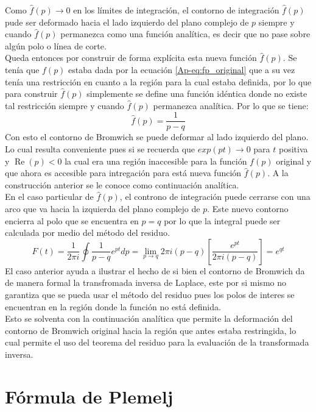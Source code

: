 \documentclass[../tesis_main_file.tex]{subfiles}
\begin{document}
Como $\widehat{f}(p) \rightarrow 0$ en los límites de integración, el contorno de integración $\widehat{f}(p)$ pude ser deformado hacia el lado izquierdo del plano complejo de $p$ siempre y cuando $\widehat{f}(p)$ permanezca como una función analítica, es decir que no pase sobre algún polo o línea de corte.\\
Queda entonces por construir de forma explícita esta nueva función $\widehat{f}(p)$. Se tenía que $f(p)$ estaba dada por la ecuación \ref{Ap-eq:fp_original} que a su vez tenía una restricción en cuanto a la región para la cual estaba definida, por lo que para construir $\widehat{f}(p)$ simplemente se define una función idéntica donde no existe tal restricción siempre y cuando $\widehat{f}(p)$ permanezca analítica. Por lo que se tiene:
\begin{equation}
\widehat{f}(p) = \frac{1}{p-q}
\end{equation}
Con esto el contorno de Bromwich se puede deformar al lado izquierdo del plano. Lo cual resulta conveniente pues si se recuerda que $exp(pt) \rightarrow 0$ para $t$ positiva y $\operatorname{Re}(p) <0$ la cual era una región inaccesible para la función $f(p)$ original y que ahora es accesible para intregación para está nueva función $\widehat{f}(p)$. A la construcción anterior se le conoce como continuación analítica.\\
En el caso particular de $\widehat{f}(p)$, el controno de integración puede cerrarse con una arco que va hacia la izquierda del plano complejo de $p$. Este nuevo contorno encierra al polo que se encuentra en $p=q$ por lo que la integral puede ser calculada por medio del método del residuo.
\begin{equation}
F(t) =\frac{1}{2\pi i}\oint \frac{1}{p-q}e^{pt}dp= \lim_{p\to q}2\pi i(p-q)\left[\frac{e^{pt}}{2\pi i (p-q)}\right]=e^{qt}
\end{equation}
El caso anterior ayuda a ilustrar el hecho de si bien el contorno de Bromwich da de manera formal la transfromada inversa de Laplace, este por si mismo no garantiza que se pueda usar el método del residuo pues los polos de interes se encuentran en la región donde la función no está definida.\\
Esto se solventa con la continuación analítica que permite la deformación del contorno de Bromwich original hacia la región que antes estaba restringida, lo cual permite el uso del teorema del residuo para la evaluación de la transformada inversa.
\section{Fórmula de Plemelj}\label{Ap2:Plemelj}
\onlyinsubfile{}
\onlyinsubfile{}
\end{document}
